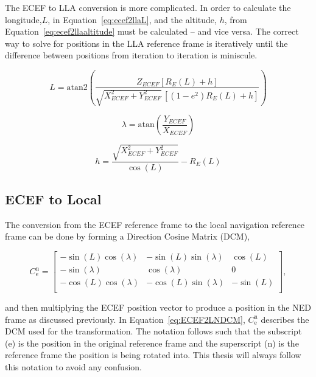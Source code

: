 The ECEF to LLA conversion is more complicated. In order to calculate the longitude,\(L\), in Equation~\ref{eq:ecef2llaL}, and the altitude, \(h\), from Equation~\ref{eq:ecef2llaaltitude} must be calculated {--} and vice versa. The correct way to solve for positions in the LLA reference frame is iteratively until the difference between positions from iteration to iteration is miniscule.

\begin{equation}\label{eq:ecef2llaL}
    L = \textrm{atan2}\left(\frac{Z_{ECEF} \left[R_E (L) + h\right]}{\sqrt{X_{ECEF}^2 + Y^2_{ECEF}} \, \left[ \left(1 - e^2\right) R_E (L) + h\right]}\right)
\end{equation}

\begin{equation}\label{eq:ecef2llalambda}
    \lambda = \textrm{atan}\left(\frac{Y_{ECEF}}{X_{ECEF}}\right)
\end{equation}

\begin{equation}\label{eq:ecef2llaaltitude}
    h = \frac{\sqrt{X_{ECEF}^2 + Y^2_{ECEF}}}{\cos\left(L\right)} - R_E (L)
\end{equation}


\subsection{ECEF to Local}
The conversion from the ECEF reference frame to the local navigation reference frame can be done by forming a Direction Cosine Matrix (DCM),

\begin{equation}\label{eq:ECEF2LNDCM}
    C^{\textrm{n}}_{\textrm{e}} =
    \begin{bmatrix}
        -\sin\left(L\right)\cos\left(\lambda\right) & -\sin\left(L\right)\sin\left(\lambda\right) & \cos\left(L\right)  \\
        -\sin\left(\lambda\right)                   & \cos\left(\lambda\right)                    & 0                   \\
        -\cos\left(L\right)\cos\left(\lambda\right) & -\cos\left(L\right)\sin\left(\lambda\right) & -\sin\left(L\right) \\
    \end{bmatrix},
\end{equation}

and then multiplying the ECEF position vector to produce a position in the NED frame as discussed previously. In Equation~\ref{eq:ECEF2LNDCM}, \(C^{\textrm{n}}_{\textrm{e}}\) describes the DCM used for the transformation. The notation follows such that the subscript (e) is the position in the original reference frame and the superscript (n) is the reference frame the position is being rotated into. This thesis will always follow this notation to avoid any confusion.

